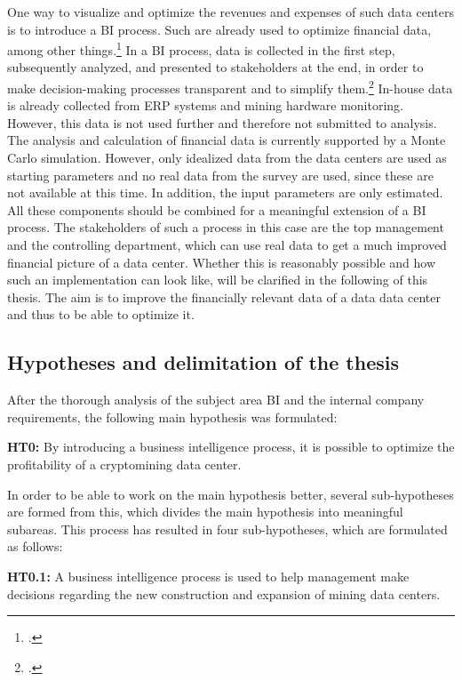 One way to visualize and optimize the revenues and expenses of such data centers is to introduce a 
\ac{BI} process. Such are already used to optimize financial data, among other things.\footcite[Cf.][pp. 105]{azma2012business} 
In a \ac{BI} process, data is collected in the first step, subsequently analyzed, and presented to stakeholders at the end,
in order to make decision-making processes transparent and to simplify them.\footcite[Cf.][pp. 1]{loshin2012business} 
In-house data is already collected from \ac{ERP} systems and mining hardware monitoring. 
However, this data is not used further and therefore not submitted to analysis. The analysis and calculation of financial data is
currently supported by a Monte Carlo simulation. However, only idealized data from the data centers are used as starting parameters and 
no real data from the survey are used, since these are not available at this time. In addition, the input parameters are
only estimated. All these components should be combined for a meaningful extension of a \ac{BI} process. The stakeholders of
such a process in this case are the top management and the controlling department, which can use
real data to get a much improved financial picture of a data center. Whether this is reasonably possible 
and how such an implementation can look like, will be clarified in the following of this thesis. The aim is to improve the financially relevant data of a data 
data center and thus to be able to optimize it. 

\subsection{Hypotheses and delimitation of the thesis} \label{toc:hypothesenundabgrenzungderarbeit}

After the thorough analysis of the subject area \ac{BI} and the internal company requirements, the following main hypothesis was 
formulated: 

\textbf{\ac{HT0}: }By introducing a business intelligence process, it is possible to optimize the profitability of a cryptomining
data center. 

In order to be able to work on the main hypothesis better, several sub-hypotheses are formed from this, which divides the main hypothesis into
meaningful subareas. This process has resulted in four sub-hypotheses, which are formulated as follows: 

\textbf{\ac{HT0.1}: }A business intelligence process is used to help management make decisions regarding the
new construction and expansion of mining data centers. 

